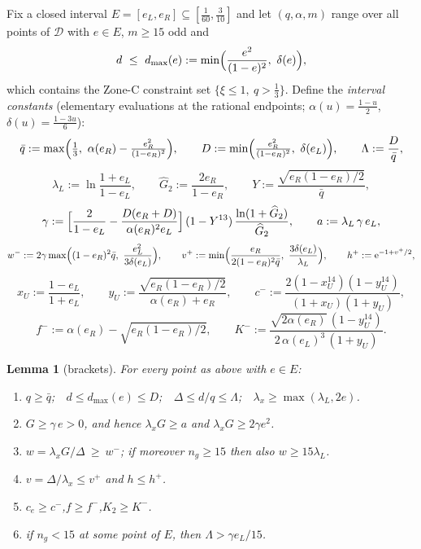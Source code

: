 \documentclass[11pt]{article}
\newtheorem{lemma}[theorem]{Lemma}
\theoremstyle{remark}
\theoremstyle{plain}
\theoremstyle{plain}
\newcommand{\eu}{\mathrm{e}}
\newcommand{\D}{\mathcal D}
\begin{document}
Fix a closed interval $E=[e_L,e_R]\subseteq[\tfrac1{60},\tfrac3{10}]$ and let
$(q,\alpha,m)$ range over all points of $\D$ with $e\in E$, $m\ge15$ odd and
\begin{equation}\label{eq:dcap}
 d\ \le\ d_{\max}(e):=\min\Bigl(\frac{e^2}{(1-e)^2},\ \delta(e)\Bigr),
\end{equation}
which contains the Zone-C constraint set $\{\xi\le1,\ q>\tfrac13\}$.
Define the \emph{interval constants} (elementary evaluations at the rational
endpoints; $\alpha(u)=\tfrac{1-u}2$, $\delta(u)=\tfrac{1-3u}6$):
\[
 \bar q:=\max\Bigl(\tfrac13,\ \alpha(e_R)-\tfrac{e_R^2}{(1-e_R)^2}\Bigr),
 \qquad
 D:=\min\Bigl(\tfrac{e_R^2}{(1-e_R)^2},\ \delta(e_L)\Bigr),
 \qquad
 \Lambda:=\frac D{\bar q},
\]
\[
 \lambda_L:=\ln\frac{1+e_L}{1-e_L},\qquad
 \widehat G_2:=\frac{2e_R}{1-e_R},\qquad
 Y:=\frac{\sqrt{e_R(1-e_R)/2}}{\bar q},
\]
\[
 \gamma:=\Bigl[\frac2{1-e_L}-\frac{D(e_R+D)}{\alpha(e_R)^2e_L}\Bigr]
 \,(1-Y^{13})\,\frac{\ln(1+\widehat G_2)}{\widehat G_2},
 \qquad
 a:=\lambda_L\,\gamma\,e_L,
\]
\[
 w^-:=2\gamma\max\Bigl((1-e_R)^2\bar q,\ \frac{e_L^2}{3\delta(e_L)}\Bigr),
 \qquad
 v^+:=\min\Bigl(\frac{e_R}{2(1-e_R)^2\bar q},\ \frac{3\delta(e_L)}{\lambda_L}
 \Bigr),\qquad
 h^+:=\eu^{-1+v^+/2},
\]
\[
 x_U:=\frac{1-e_L}{1+e_L},\qquad
 y_U:=\frac{\sqrt{e_R(1-e_R)/2}}{\alpha(e_R)+e_R},\qquad
 c^-:=\frac{2(1-x_U^{14})(1-y_U^{14})}{(1+x_U)(1+y_U)},
\]
\[
 f^-:=\alpha(e_R)-\sqrt{e_R(1-e_R)/2},\qquad
 K^-:=\frac{\sqrt{2\alpha(e_R)}\,(1-y_U^{14})}{2\,\alpha(e_L)^3\,(1+y_U)}.
\]

\begin{lemma}[brackets]\label{lem:zc-bracket}
For every point as above with $e\in E$:
\begin{enumerate}
\item[(a)] $q\ge\bar q$;\ \ $d\le d_{\max}(e)\le D$;\ \
  $\Delta\le d/q\le\Lambda$;\ \ $\lambda_x\ge\max(\lambda_L,2e)$.
\item[(b)] $G\ge\gamma\,e>0$, and hence
  $\lambda_xG\ge a$ and $\lambda_xG\ge2\gamma e^2$.
\item[(c)] $w=\lambda_xG/\Delta\ \ge\ w^-$; if moreover $n_g\ge15$ then also
  $w\ge15\lambda_L$.
\item[(d)] $v=\Delta/\lambda_x\le v^+$ and $h\le h^+$.
\item[(e)] $c_e\ge c^-$,\quad $f\ge f^-$,\quad $K_2\ge K^-$.
\item[(f)] if $n_g<15$ at some point of $E$, then $\Lambda>\gamma e_L/15$.
\end{enumerate}
\end{lemma}
\end{document}
